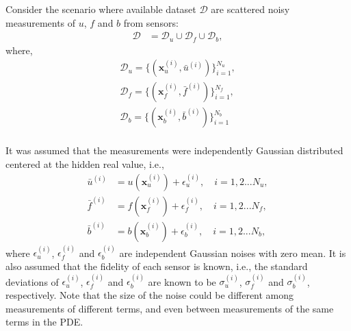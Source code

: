 \documentclass[conference,compsoc]{IEEEtran}
\begin{document}
Consider the scenario where available dataset $\mathcal{D}$ are scattered noisy measurements of $u$, $f$ and $b$ from sensors:
\begin{equation}
    \begin{aligned}
    \mathcal{D} & = \mathcal{D}_u\cup\mathcal{D}_f\cup\mathcal{D}_b,
        \end{aligned}
\end{equation}
where,
\begin{align}
    \mathcal{D}_u = \{(\boldsymbol{x}_{u}^{(i)}, \bar{u}^{(i)})\}_{i=1}^{N_u}, \\
    \mathcal{D}_f  = \{(\boldsymbol{x}_{f}^{(i)}, \bar{f}^{(i)})\}_{i=1}^{N_f}, \\
    \mathcal{D}_b = \{(\boldsymbol{x}_{b}^{(i)}, \bar{b}^{(i)})\}_{i=1}^{N_b} \\
\end{align}

It was assumed that the measurements were independently Gaussian distributed centered at the hidden real value, i.e.,
\begin{equation}
    \begin{aligned}
    \bar{u}^{(i)} &= u(\boldsymbol{x}_{u}^{(i)}) + \epsilon_u^{(i)}, \quad i = 1,2...N_u, \\
    \bar{f}^{(i)} &= f(\boldsymbol{x}_{f}^{(i)}) + \epsilon_f^{(i)}, \quad i = 1,2...N_f, \\
    \bar{b}^{(i)} &= b(\boldsymbol{x}_{b}^{(i)}) + \epsilon_b^{(i)}, \quad i = 1,2...N_b,
    \end{aligned}
\end{equation}
where $\epsilon_u^{(i)}$, $\epsilon_f^{(i)}$ and $\epsilon_b^{(i)}$ are independent Gaussian noises with zero mean. It is also assumed that the fidelity of each sensor is known\cite{raissi2017inferring}, i.e., the standard deviations of $\epsilon_u^{(i)}$, $\epsilon_f^{(i)}$ and $\epsilon_b^{(i)}$ are known to be $\sigma_u^{(i)}$, $\sigma_f^{(i)}$ and $\sigma_b^{(i)}$, respectively. Note that the size of the noise could be different among measurements of different terms, and even between measurements of the same terms in the PDE.
\end{document}
